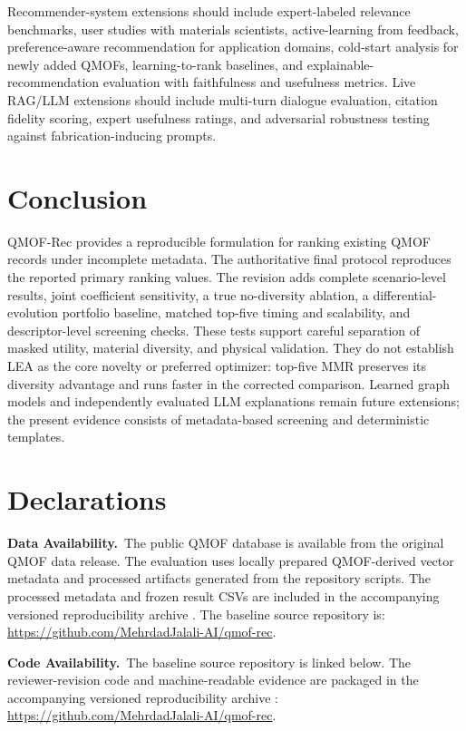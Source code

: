\documentclass[12pt,a4paper]{article}
\begin{document}
Recommender-system extensions should include expert-labeled relevance benchmarks, user studies with materials scientists, active-learning from feedback, preference-aware recommendation for application domains, cold-start analysis for newly added QMOFs, learning-to-rank baselines, and explainable-recommendation evaluation with faithfulness and usefulness metrics. Live RAG/LLM extensions should include multi-turn dialogue evaluation, citation fidelity scoring, expert usefulness ratings, and adversarial robustness testing against fabrication-inducing prompts.

\section{Conclusion}
\label{sec:conclusion}

QMOF-Rec provides a reproducible formulation for ranking existing QMOF records under incomplete metadata. The authoritative final protocol reproduces the reported primary ranking values. The revision adds complete scenario-level results, joint coefficient sensitivity, a true no-diversity ablation, a differential-evolution portfolio baseline, matched top-five timing and scalability, and descriptor-level screening checks. These tests support careful separation of masked utility, material diversity, and physical validation. They do not establish LEA as the core novelty or preferred optimizer: top-five MMR preserves its diversity advantage and runs faster in the corrected comparison. Learned graph models and independently evaluated LLM explanations remain future extensions; the present evidence consists of metadata-based screening and deterministic templates.

\section*{Declarations}

\noindent\textbf{Data Availability.}\ The public QMOF database is available from the original QMOF data release. The evaluation uses locally prepared QMOF-derived vector metadata and processed artifacts generated from the repository scripts. The processed metadata and frozen result CSVs are included in the accompanying versioned reproducibility archive . The baseline source repository is: \url{https://github.com/MehrdadJalali-AI/qmof-rec}.

\noindent\textbf{Code Availability.}\ The baseline source repository is linked below. The reviewer-revision code and machine-readable evidence are packaged in the accompanying versioned reproducibility archive : \url{https://github.com/MehrdadJalali-AI/qmof-rec}.
\end{document}
